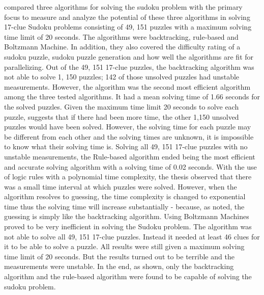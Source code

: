 \documentclass[a4paper,oneside,11pt]{report}
\begin{document}
\cite{Berggren} compared three algorithms for solving the sudoku problem with the primary focus to measure and analyze the potential of these three algorithms in solving 17-clue Sudoku problems consisting of 49, 151 puzzles with a maximum solving time limit of 20 seconds. The algorithms were backtracking, rule-based and Boltzmann Machine. In addition, they also covered the difficulty rating of a sudoku puzzle, sudoku puzzle generation and how well the algorithms are fit for parallelizing. Out of the 49, 151 17-clue puzzles, the backtracking algorithm was not able to solve 1, 150 puzzles; 142 of those unsolved puzzles had unstable measurements. However, the algorithm was the second most efficient algorithm among the three tested algorithms. It had a mean solving time of 1.66 seconds for the solved puzzles. Given the maximum time limit 20 seconds to solve each puzzle, \cite{Berggren} suggests that if there had been more time, the other 1,150 unsolved puzzles would have been solved. However, the solving time for each puzzle may be different from each other and the solving times are unknown, it is impossible to know what their solving time is. Solving all 49, 151 17-clue puzzles with no unstable measurements, the Rule-based algorithm ended being the most efficient and accurate solving algorithm with a solving time of 0.02 seconds. With the use of logic rules with a polynomial time complexity, the thesis observed that there was a small time interval at which puzzles were solved. However, when the algorithm resolves to guessing, the time complexity is changed to exponential time thus the solving time will increase substantially - because, as noted, the guessing is simply like the backtracking algorithm. Using Boltzmann Machines proved to be very inefficient in solving the Sudoku problem. The algorithm was not able to solve all 49, 151 17-clue puzzles. Instead it needed at least 46 clues for it to be able to solve a puzzle. All results were still given a maximum solving time limit of 20 seconds. But the results turned out to be terrible and the measurements were unstable. In the end, as shown, only the backtracking algorithm and the rule-based algorithm were found to be capable of solving the sudoku problem.\\
	
\end{document}
